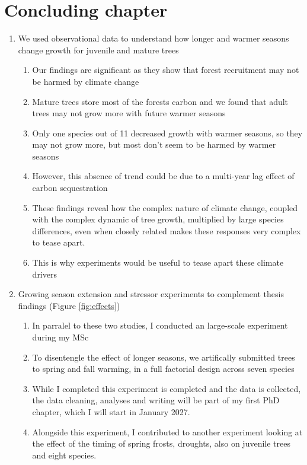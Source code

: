 \chapter{Concluding chapter}
\label{ch:conclusion}

\begin{enumerate}
\item We used observational data to understand how longer and warmer seasons change growth for juvenile and mature trees
	\begin{enumerate}
	\item Our findings are significant as they show that forest recruitment may not be harmed by climate change
	
	\item Mature trees store most of the forests carbon and we found that adult trees may not grow more with future warmer seasons 
	
	\item Only one species out of 11 decreased growth with warmer seasons, so they may not grow more, but most don't seem to be harmed by warmer seasons
  
  \item However, this absence of trend could be due to a multi-year lag effect of carbon sequestration
  
  \item These findings reveal how the complex nature of climate change, coupled with the complex dynamic of tree growth, multiplied by large species differences, even when closely related makes these responses very complex to tease apart.
  
  \item This is why experiments would be useful to tease apart these climate drivers
  
	\end{enumerate}

\item Growing season extension and stressor experiments to complement thesis findings (Figure \ref{fig:effects})
  \begin{enumerate}
  \item In parralel to these two studies, I conducted an large-scale experiment during my MSc
  
  \item To disentengle the effect of longer seasons, we artifically submitted trees to spring and fall warming, in a full factorial design across seven species
  
  \item While I completed this experiment is completed and the data is collected, the data cleaning, analyses and writing will be part of my first PhD chapter, which I will start in January 2027.
  
  \item Alongside this experiment, I contributed to another experiment looking at the effect of the timing of spring frosts, droughts, also on juvenile trees and eight species.
  \end{enumerate}
  
\end{enumerate}


